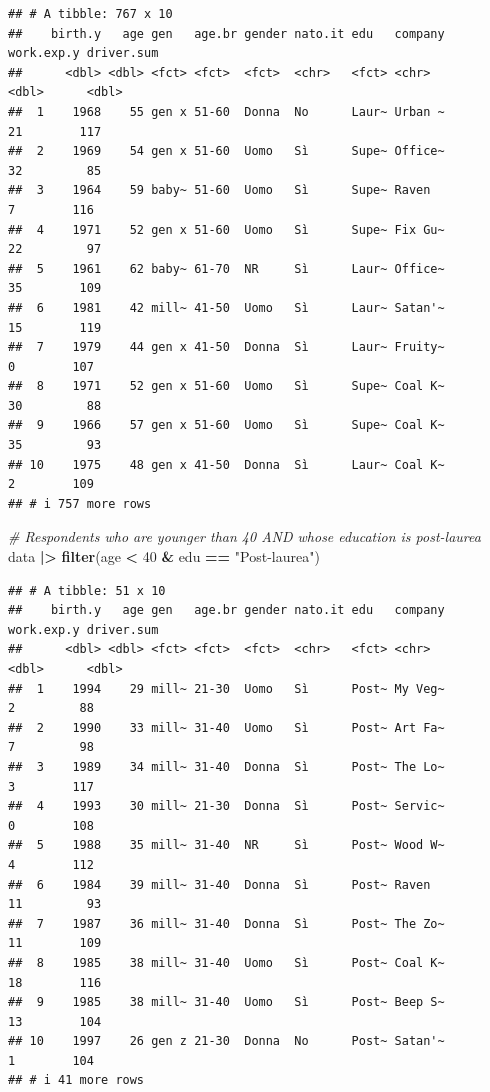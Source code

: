 \documentclass[
]{book}
\newenvironment{Shaded}{\begin{snugshade}}{\end{snugshade}}
\newcommand{\CommentTok}[1]{\textcolor[rgb]{0.56,0.35,0.01}{\textit{#1}}}
\newcommand{\DecValTok}[1]{\textcolor[rgb]{0.00,0.00,0.81}{#1}}
\newcommand{\FunctionTok}[1]{\textcolor[rgb]{0.13,0.29,0.53}{\textbf{#1}}}
\newcommand{\NormalTok}[1]{#1}
\newcommand{\SpecialCharTok}[1]{\textcolor[rgb]{0.81,0.36,0.00}{\textbf{#1}}}
\newcommand{\StringTok}[1]{\textcolor[rgb]{0.31,0.60,0.02}{#1}}
\begin{document}
\begin{verbatim}
## # A tibble: 767 x 10
##    birth.y   age gen   age.br gender nato.it edu   company work.exp.y driver.sum
##      <dbl> <dbl> <fct> <fct>  <fct>  <chr>   <fct> <chr>        <dbl>      <dbl>
##  1    1968    55 gen x 51-60  Donna  No      Laur~ Urban ~         21        117
##  2    1969    54 gen x 51-60  Uomo   Sì      Supe~ Office~         32         85
##  3    1964    59 baby~ 51-60  Uomo   Sì      Supe~ Raven            7        116
##  4    1971    52 gen x 51-60  Uomo   Sì      Supe~ Fix Gu~         22         97
##  5    1961    62 baby~ 61-70  NR     Sì      Laur~ Office~         35        109
##  6    1981    42 mill~ 41-50  Uomo   Sì      Laur~ Satan'~         15        119
##  7    1979    44 gen x 41-50  Donna  Sì      Laur~ Fruity~          0        107
##  8    1971    52 gen x 51-60  Uomo   Sì      Supe~ Coal K~         30         88
##  9    1966    57 gen x 51-60  Uomo   Sì      Supe~ Coal K~         35         93
## 10    1975    48 gen x 41-50  Donna  Sì      Laur~ Coal K~          2        109
## # i 757 more rows
\end{verbatim}

\begin{Shaded}
\begin{Highlighting}[]
\CommentTok{\# Respondents who are younger than 40 AND whose education is post{-}laurea}
\NormalTok{data }\SpecialCharTok{|\textgreater{}} 
  \FunctionTok{filter}\NormalTok{(age }\SpecialCharTok{\textless{}} \DecValTok{40} \SpecialCharTok{\&}\NormalTok{ edu }\SpecialCharTok{==} \StringTok{"Post{-}laurea"}\NormalTok{)}
\end{Highlighting}
\end{Shaded}

\begin{verbatim}
## # A tibble: 51 x 10
##    birth.y   age gen   age.br gender nato.it edu   company work.exp.y driver.sum
##      <dbl> <dbl> <fct> <fct>  <fct>  <chr>   <fct> <chr>        <dbl>      <dbl>
##  1    1994    29 mill~ 21-30  Uomo   Sì      Post~ My Veg~          2         88
##  2    1990    33 mill~ 31-40  Uomo   Sì      Post~ Art Fa~          7         98
##  3    1989    34 mill~ 31-40  Donna  Sì      Post~ The Lo~          3        117
##  4    1993    30 mill~ 21-30  Donna  Sì      Post~ Servic~          0        108
##  5    1988    35 mill~ 31-40  NR     Sì      Post~ Wood W~          4        112
##  6    1984    39 mill~ 31-40  Donna  Sì      Post~ Raven           11         93
##  7    1987    36 mill~ 31-40  Donna  Sì      Post~ The Zo~         11        109
##  8    1985    38 mill~ 31-40  Uomo   Sì      Post~ Coal K~         18        116
##  9    1985    38 mill~ 31-40  Uomo   Sì      Post~ Beep S~         13        104
## 10    1997    26 gen z 21-30  Donna  No      Post~ Satan'~          1        104
## # i 41 more rows
\end{verbatim}
\end{document}
